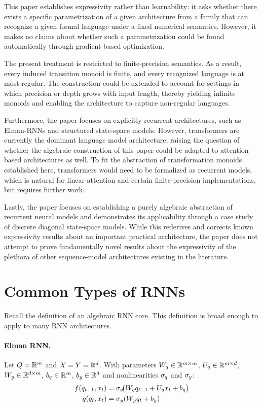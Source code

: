 \documentclass{article}
\begin{document}
This paper establishes expressivity rather than learnability: it asks whether there exists a specific parametrization of a given architecture from a family that can recognize a given formal language under a fixed numerical semantics. However, it makes no claims about whether such a parametrization could be found automatically through gradient-based optimization.

The present treatment is restricted to finite-precision semantics. As a result, every induced transition monoid is finite, and every recognized language is at most regular. 
The construction could be extended to account for settings in which precision or depth grows with input length, thereby yielding infinite monoids and enabling the architecture to capture non-regular languages.

Furthermore, the paper focuses on explicitly recurrent architectures, such as Elman-RNNs and structured state-space models. However, transformers are currently the dominant language model architecture, raising the question of whether the algebraic construction of this paper could be adapted to attention-based architectures as well. To fit the abstraction of transformation monoids established here, transformers would need to be formalized as recurrent models, which is natural for linear attention and certain finite-precision implementations, but requires further work. 

Lastly, the paper focuses on establishing a purely algebraic abstraction of recurrent neural models and demonstrates its applicability through a case study of discrete diagonal state-space models. While this rederives and corrects known expressivity results about an important practical architecture, the paper does not attempt to prove fundamentally novel results about the expressivity of the plethora of other sequence-model architectures existing in the literature.

\section{Common Types of RNNs}\label{app:rnn_types}
Recall the definition of an algebraic RNN core.
\rnncoredef*
This definition is broad enough to apply to many RNN architectures.
\paragraph{Elman RNN.}
Let $Q=\mathbb{R}^m$ and $X=Y=\mathbb{R}^d$. With parameters $W_q\in\mathbb{R}^{m\times m}$, $U_q\in\mathbb{R}^{m\times d}$, $W_y\in\mathbb{R}^{d\times m}$,  $b_q\in\mathbb{R}^m$, $b_y\in\mathbb{R}^d$
and nonlinearities $\sigma_q$ and $\sigma_y$:
\begin{align}
    f(q_{t-1},x_t)&=\sigma_q\!\bigl(W_qq_{t-1}+U_qx_{t}+b_q\bigr)\label{eq:elman-recurrence}\\
    g(q_t,x_t)&=\sigma_y(W_y q_t+b_y)
\end{align}
\end{document}
